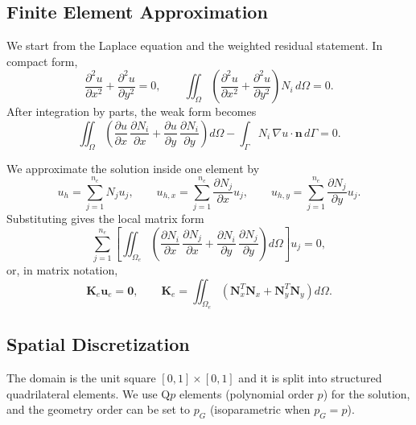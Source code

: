 \documentclass[12pt]{article}
\begin{document}
\subsection{Finite Element Approximation}
We start from the Laplace equation and the weighted residual statement. In compact form,
\begin{equation}
\frac{\partial^2 u}{\partial x^2} + \frac{\partial^2 u}{\partial y^2} = 0, \qquad
\iint_{\Omega} \left( \frac{\partial^2 u}{\partial x^2} + \frac{\partial^2 u}{\partial y^2} \right) N_i\, d\Omega = 0.
\end{equation}
After integration by parts, the weak form becomes
\begin{equation}
\iint_{\Omega} \left( \frac{\partial u}{\partial x}\, \frac{\partial N_i}{\partial x} + \frac{\partial u}{\partial y}\, \frac{\partial N_i}{\partial y} \right) d\Omega
- \int_{\Gamma} N_i\, \nabla u \cdot \mathbf{n}\, d\Gamma = 0.
\end{equation}

We approximate the solution inside one element by
\begin{equation}
u_h = \sum_{j=1}^{n_e} N_j u_j, \qquad
u_{h,x} = \sum_{j=1}^{n_e} \frac{\partial N_j}{\partial x} u_j, \qquad
u_{h,y} = \sum_{j=1}^{n_e} \frac{\partial N_j}{\partial y} u_j.
\end{equation}
Substituting gives the local matrix form
\begin{equation}
\sum_{j=1}^{n_e} \left[ \iint_{\Omega_e} \left( \frac{\partial N_i}{\partial x}\, \frac{\partial N_j}{\partial x} + \frac{\partial N_i}{\partial y}\, \frac{\partial N_j}{\partial y} \right) d\Omega \right] u_j = 0,
\end{equation}
or, in matrix notation,
\begin{equation}
\mathbf{K}_e \mathbf{u}_e = \mathbf{0}, \qquad
\mathbf{K}_e = \iint_{\Omega_e} \left( \mathbf{N}_x^T \mathbf{N}_x + \mathbf{N}_y^T \mathbf{N}_y \right) d\Omega.
\end{equation}

\subsection{Spatial Discretization}

The domain is the unit square $[0,1] \times [0,1]$ and it is split into structured quadrilateral elements. We use Q$p$ elements (polynomial order $p$) for the solution, and the geometry order can be set to $p_G$ (isoparametric when $p_G=p$).
\end{document}
